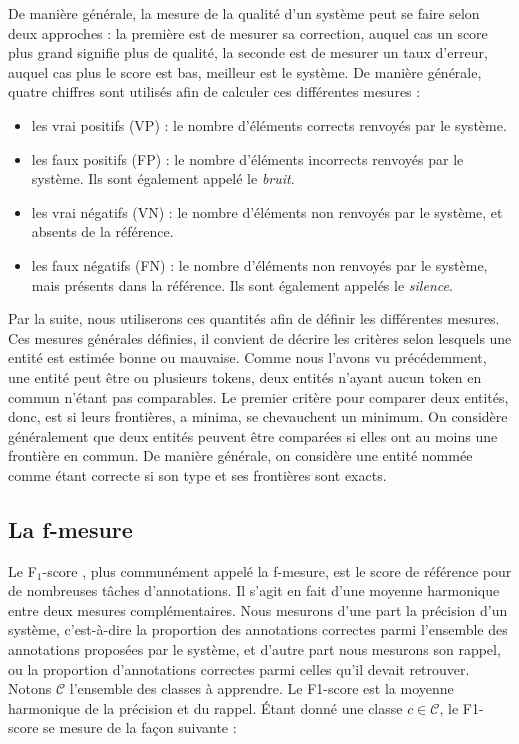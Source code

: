 \documentclass[PhD-Yoann-Dupont.tex]{subfiles}
\begin{document}
De manière générale, la mesure de la qualité d'un système peut se faire selon deux approches : la première est de mesurer sa correction, auquel cas un score plus grand signifie plus de qualité, la seconde est de mesurer un taux d'erreur, auquel cas plus le score est bas, meilleur est le système. De manière générale, quatre chiffres sont utilisés afin de calculer ces différentes mesures :

\begin{itemize}
\item les vrai positifs (VP) : le nombre d'éléments corrects renvoyés par le système.
\item les faux positifs (FP) : le nombre d'éléments incorrects renvoyés par le système. Ils sont également appelé le \emph{bruit}.
\item les vrai négatifs (VN) : le nombre d'éléments non renvoyés par le système, et absents de la référence.
\item les faux négatifs (FN) : le nombre d'éléments non renvoyés par le système, mais présents dans la référence. Ils sont également appelés le \emph{silence}.
\end{itemize}

Par la suite, nous utiliserons ces quantités afin de définir les différentes mesures. Ces mesures générales définies, il convient de décrire les critères selon lesquels une entité est estimée bonne ou mauvaise. Comme nous l'avons vu précédemment, une entité peut être ou plusieurs tokens, deux entités n'ayant aucun token en commun n'étant pas comparables. Le premier critère pour comparer deux entités, donc, est si leurs frontières, a minima, se chevauchent un minimum. On considère généralement que deux entités peuvent être comparées si elles ont au moins une frontière en commun. De manière générale, on considère une entité nommée comme étant correcte si son type et ses frontières sont exacts.

\subsection{La f-mesure}

Le F$_{1}$-score \citep{van1979information}, plus communément appelé la f-mesure, est le score de référence pour de nombreuses tâches d'annotations. Il s'agit en fait d'une moyenne harmonique entre deux mesures complémentaires. Nous mesurons d'une part la précision d'un système, c'est-à-dire la proportion des annotations correctes parmi l'ensemble des annotations proposées par le système, et d'autre part nous mesurons son rappel, ou la proportion d'annotations correctes parmi celles qu'il devait retrouver. Notons $\mathcal{C}$ l'ensemble des classes à apprendre. Le F1-score est la moyenne harmonique de la précision et du rappel. Étant donné une classe $c \in \mathcal{C}$, le F1-score se mesure de la façon suivante :
\end{document}
